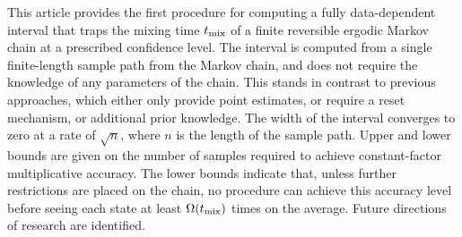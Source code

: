 This article provides the first procedure for computing a fully
data-dependent interval that traps the mixing time $t_{\operatorname{mix}}$ of a finite
reversible ergodic Markov chain at a prescribed confidence level.
The interval is computed from a single finite-length sample
path from the Markov chain, and does not require the 
knowledge of any parameters of the chain.
This stands in contrast to previous approaches, which either 
only provide point estimates, or require a
reset mechanism, or additional prior knowledge.
The width of the interval converges to zero at a
rate of
$\sqrt{n}$, where $n$ is the length of the sample path.
Upper and lower bounds are given on the number of samples required to
achieve constant-factor multiplicative accuracy.
The lower bounds indicate that, unless further restrictions are placed
on the chain, no procedure can achieve this accuracy level before
seeing each state at least $\Omega(t_{\operatorname{mix}})$ times on the average.
Future directions of research are identified.


%
%
